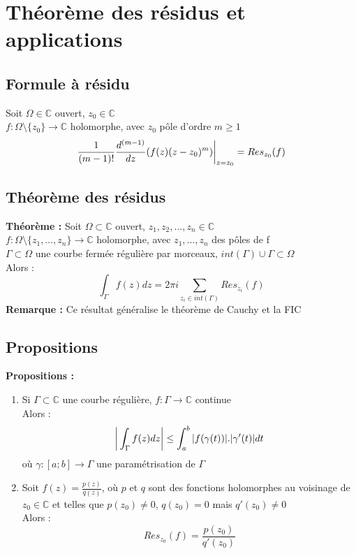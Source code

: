 \section{Théorème des résidus et applications}
\subsection{Formule à résidu}
Soit $\Omega \in \mathbb{C}$ ouvert, $z_0 \in \mathbb{C}$ \\
$f : \Omega \setminus \{z_0\} \to \mathbb{C}$ holomorphe, avec $z_0$ pôle d'ordre $m \geq 1$
$$\frac{1}{(m-1)!}\frac{d^{(m-1)}}{dz}(f(z)(z-z_0)^m)\bigg{|}_{z=z_0} = Res_{z_0}(f)$$

\subsection{Théorème des résidus}
\textbf{Théorème :} Soit $\Omega \subset \mathbb{C}$ ouvert, $z_1,z_2,...,z_n \in \mathbb{C}$ \\
$f : \Omega \setminus \{z_1,...,z_n\} \to \mathbb{C}$ holomorphe, avec $z_1,...,z_n$ des pôles de f \\
$\Gamma \subset \Omega$ une courbe fermée régulière par morceaux, $int(\Gamma) \cup \Gamma \subset \Omega$ \\
Alors :
$$\int_{\Gamma}f(z)dz = 2\pi i \sum_{z_i \in int(\Gamma)}Res_{z_i}(f)$$
\textbf{Remarque :} Ce résultat généralise le théorème de Cauchy et la FIC

\subsection{Propositions}
\textbf{Propositions :}
\begin{enumerate}
    \item Si $\Gamma \subset \mathbb{C}$ une courbe régulière, $f : \Gamma \to \mathbb{C}$ continue \\
    Alors :
    $$\bigg{|} \int_{\Gamma}f(z)dz \bigg{|} \leq \int_a^b|f(\gamma(t))|.|\gamma'(t)|dt$$
    où $\gamma : [a;b] \to \Gamma$ une paramétrisation de $\Gamma$
    \item Soit $f(z) = \frac{p(z)}{q(z)}$, où $p$ et $q$ sont des fonctions holomorphes au voisinage de $z_0 \in \mathbb{C}$ et telles que $p(z_0) \neq 0$, $q(z_0)=0$ mais $q'(z_0) \neq 0$ \\
    Alors :
    $$Res_{z_0}(f) = \frac{p(z_0)}{q'(z_0)}$$
\end{enumerate}

